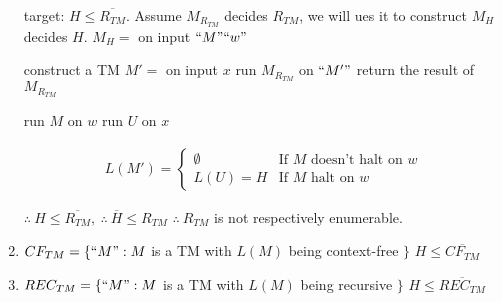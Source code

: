 \begin{enumerate}
    \subitem target: $H\le \overline{R_{TM}}$. 
    \subitem Assume $M_{R_{TM}}$ decides $R_{TM}$, we will ues it to construct $M_{H}$ decides $H$. 
    \subitem $M_H=$ on input $``M"``w"$
    \begin{algorithm}[H]
        \caption{$M_H$}
        \begin{algorithmic}
            \State construct a TM $M'=$ on input $x$
            \State run $M_{R_{TM}}$ on $``M'"$
            \State return the result of $M_{R_{TM}}$
        \end{algorithmic}
    \end{algorithm}
    
    \begin{algorithm}[H]
        \caption{$M'$}
        \begin{algorithmic}
            \State run $M$ on $w$
            \State run $U$ on $x$
        \end{algorithmic}
    \end{algorithm}
    \begin{align*}
        L(M')=\left\{ \begin{array}{ll}
            \emptyset & \text{If $M$ doesn't halt on } w\\
            L(U)=H & \text{If $M$ halt on } w
        \end{array} \right.
    \end{align*}

    \subitem $\therefore\ H\le \overline{R_{TM}},\ \therefore\ \overline{H}\le R_{TM}$
    \subitem $\therefore\ R_{TM}$ is not respectively enumerable. 
    \item $CF_{TM}=\{ ``M": M$ is a TM with $L(M)$ being context-free $ \}$
    \subitem $H\le \overline{CF_{TM}}$
    \item $REC_{TM}=\{``M": M$ is a TM with $L(M)$ being recursive $\}$
    \subitem $H\le \overline{REC_{TM}}$
\end{enumerate}

